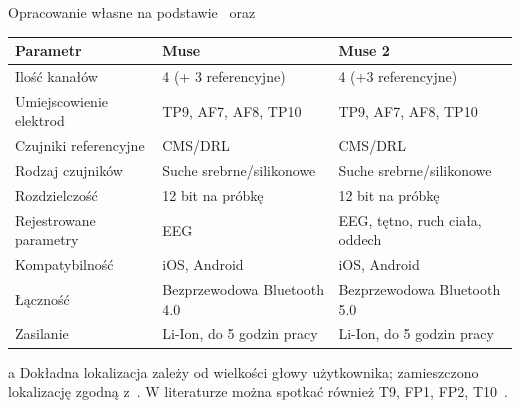 \documentclass[skorowidz,skroty]{dyplomWEZUT}
\begin{document}
{Opracowanie własne na podstawie~\cite{muse_comparison} oraz~\cite{muse_specification}}
{
    \begin{threeparttable}
        \begin{tabular}{l|l|l}
            Parametr & Muse & Muse 2 \\\hline\hline
            Ilość kanałów & 4 (+ 3 referencyjne) & 4 (+3 referencyjne)\\
            Umiejscowienie elektrod & TP9, AF7, AF8, TP10\tnote{a} & TP9, AF7, AF8, TP10\tnote{a} \\
            Czujniki referencyjne & CMS/DRL & CMS/DRL \\
            Rodzaj czujników & Suche srebrne/silikonowe & Suche srebrne/silikonowe \\
            Rozdzielczość & 12 bit na próbkę & 12 bit na próbkę \\
            Rejestrowane parametry & EEG & EEG, tętno, ruch ciała, oddech \\
            Kompatybilność & iOS, Android & iOS, Android \\
            Łączność & Bezprzewodowa Bluetooth 4.0 & Bezprzewodowa Bluetooth 5.0 \\
            Zasilanie & Li-Ion, do 5 godzin pracy & Li-Ion, do 5 godzin pracy \\
        \end{tabular}
        \begin{tablenotes}
            \item[a] \footnotesize Dokładna lokalizacja zależy od wielkości głowy użytkownika; zamieszczono lokalizację zgodną z~\cite{muse_specification}. W literaturze można spotkać również T9, FP1, FP2, T10~\cite{muse_article}.
        \end{tablenotes}
    \end{threeparttable}
}
\end{document}

